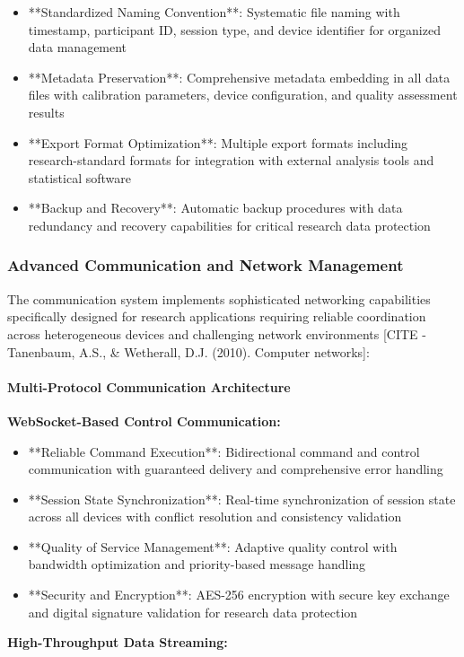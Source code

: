 \documentclass[11pt,a4paper]{report}
\begin{document}
\begin{itemize}
\item **Standardized Naming Convention**: Systematic file naming with timestamp, participant ID, session type, and device
  identifier for organized data management
\item **Metadata Preservation**: Comprehensive metadata embedding in all data files with calibration parameters, device
  configuration, and quality assessment results
\item **Export Format Optimization**: Multiple export formats including research-standard formats for integration with
  external analysis tools and statistical software
\item **Backup and Recovery**: Automatic backup procedures with data redundancy and recovery capabilities for critical
  research data protection

\end{itemize}
\subsubsection{Advanced Communication and Network Management}

The communication system implements sophisticated networking capabilities specifically designed for research
applications requiring reliable coordination across heterogeneous devices and challenging network
environments [CITE - Tanenbaum, A.S., \& Wetherall, D.J. (2010). Computer networks]:

\paragraph{Multi-Protocol Communication Architecture}

\textbf{WebSocket-Based Control Communication:}

\begin{itemize}
\item **Reliable Command Execution**: Bidirectional command and control communication with guaranteed delivery and
  comprehensive error handling
\item **Session State Synchronization**: Real-time synchronization of session state across all devices with conflict
  resolution and consistency validation
\item **Quality of Service Management**: Adaptive quality control with bandwidth optimization and priority-based message
  handling
\item **Security and Encryption**: AES-256 encryption with secure key exchange and digital signature validation for research
  data protection

\end{itemize}
\textbf{High-Throughput Data Streaming:}
\end{document}
